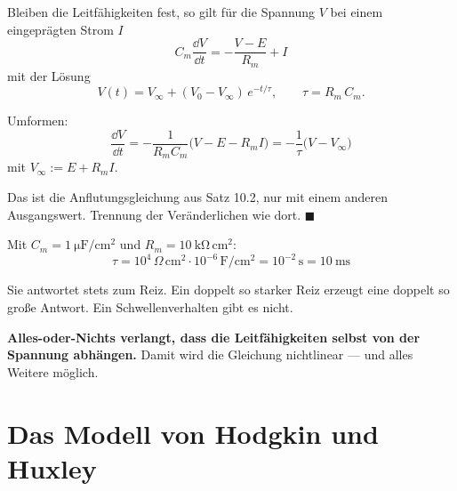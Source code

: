 \begin{merksatz}
Bleiben die Leitfähigkeiten fest, so gilt für die Spannung $V$ bei einem eingeprägten Strom $I$
\[ C_m\frac{\dd V}{\dd t} = -\frac{V - E}{R_m} + I \]
mit der Lösung
\[ V(t) = V_\infty + (V_0 - V_\infty)\,e^{-t/\tau}, \qquad \tau = R_m\,C_m . \]

Umformen:
\[ \frac{\dd V}{\dd t} = -\frac{1}{R_mC_m}\bigl(V - E - R_mI\bigr) = -\frac{1}{\tau}\bigl(V - V_\infty\bigr) \]
mit $V_\infty := E + R_mI$.

Das ist die Anflutungsgleichung aus Satz 10.2, nur mit einem anderen Ausgangswert. Trennung der Veränderlichen wie dort. $\blacksquare$

Mit $C_m = 1\ \mathrm{\mu F/cm^2}$ und $R_m = 10\ \mathrm{k\Omega\,cm^2}$:
\[ \tau = 10^4\,\Omega\,\mathrm{cm^2} \cdot 10^{-6}\,\mathrm{F/cm^2} = 10^{-2}\,\mathrm{s} = 10\ \mathrm{ms} \]

\begin{center}
\begin{minipage}{0.88\textwidth}
\end{minipage}
\end{center}

Sie antwortet stets  zum Reiz. Ein doppelt so starker Reiz erzeugt eine doppelt so große Antwort. Ein Schwellenverhalten gibt es nicht.

\begin{center}
\begin{minipage}{0.9\textwidth}
\textbf{Alles-oder-Nichts verlangt, dass die Leitfähigkeiten selbst von der Spannung abhängen.} Damit wird die Gleichung nichtlinear --- und alles Weitere möglich.
\end{minipage}
\end{center}
\end{merksatz}

\section{Das Modell von Hodgkin und Huxley}

